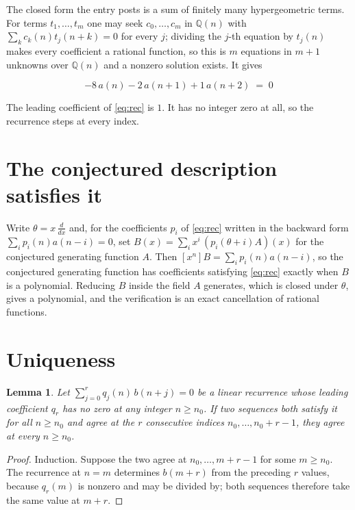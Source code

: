 \documentclass[11pt,a4paper]{article}
\theoremstyle{plain}
\newtheorem{lemma}[theorem]{Lemma}
\theoremstyle{definition}
\begin{document}
The closed form the entry posts is a sum of finitely many hypergeometric terms. For terms $t_{1},\dots,t_{m}$ one may seek $c_{0},\dots,c_{m}$ in $\mathbb{Q}(n)$ with $\sum_{k}c_{k}(n)t_{j}(n+k)=0$ for every $j$; dividing the $j$-th equation by $t_{j}(n)$ makes every coefficient a rational function, so this is $m$ equations in $m+1$ unknowns over $\mathbb{Q}(n)$ and a nonzero solution exists. It gives

\begin{equation}\label{eq:rec}
-8\,a(n) - 2\,a(n+1) + 1\,a(n+2) \;=\; 0
\end{equation}

The leading coefficient of \eqref{eq:rec} is $1$. It has no integer zero at all, so the recurrence steps at every index.

\section{The conjectured description satisfies it}

Write $\theta=x\,\frac{d}{dx}$ and, for the coefficients $p_{i}$ of \eqref{eq:rec} written in the backward form $\sum_{i}p_{i}(n)a(n-i)=0$, set $B(x)=\sum_{i}x^{i}\,(p_{i}(\theta+i)A)(x)$ for the conjectured generating function $A$. Then $[x^{n}]B=\sum_{i}p_{i}(n)a(n-i)$, so the conjectured generating function has coefficients satisfying \eqref{eq:rec} exactly when $B$ is a polynomial. Reducing $B$ inside the field $A$ generates, which is closed under $\theta$, gives a polynomial, and the verification is an exact cancellation of rational functions.

\section{Uniqueness}

\begin{lemma}\label{lem:unique}
Let $\sum_{j=0}^{r}q_{j}(n)\,b(n+j)=0$ be a linear recurrence whose leading coefficient
$q_{r}$ has no zero at any integer $n\ge n_{0}$. If two sequences both satisfy it for all
$n\ge n_{0}$ and agree at the $r$ consecutive indices $n_{0},\dots,n_{0}+r-1$, they agree
at every $n\ge n_{0}$.
\end{lemma}

\begin{proof}
Induction. Suppose the two agree at $n_{0},\dots,m+r-1$ for some $m\ge n_{0}$. The
recurrence at $n=m$ determines $b(m+r)$ from the preceding $r$ values, because $q_{r}(m)$
is nonzero and may be divided by; both sequences therefore take the same value at $m+r$.
\end{proof}
\end{document}
